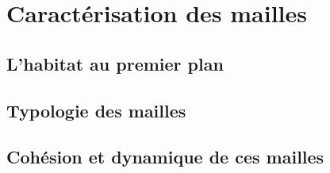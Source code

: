 \documentclass[12pt, a4paper]{article}
\begin{document}
\section{Caractérisation des mailles}

\subsection{L'habitat au premier plan}

\subsection{Typologie des mailles}

\subsection{Cohésion et dynamique de ces mailles}

\nocite{*}
%
%
\end{document}

